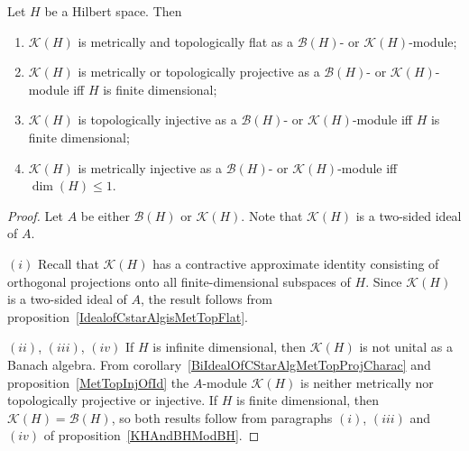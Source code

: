 \begin{proposition}\label{KHAndBHModKH} Let $H$ be a Hilbert space. Then 

\begin{enumerate}[label = (\roman*)]
    \item $\mathcal{K}(H)$ is metrically and topologically flat 
    as a $\mathcal{B}(H)$- or $\mathcal{K}(H)$-module;

    \item $\mathcal{K}(H)$ is metrically or topologically projective as
    a $\mathcal{B}(H)$- or $\mathcal{K}(H)$-module iff $H$ is finite dimensional;

    \item $\mathcal{K}(H)$ is topologically injective as a $\mathcal{B}(H)$- 
    or $\mathcal{K}(H)$-module iff $H$ is finite dimensional;

    \item $\mathcal{K}(H)$ is metrically injective as a $\mathcal{B}(H)$- 
    or $\mathcal{K}(H)$-module iff $\dim(H)\leq 1$.
\end{enumerate}
\end{proposition}
\begin{proof} Let $A$ be either $\mathcal{B}(H)$ or $\mathcal{K}(H)$. Note that
$\mathcal{K}(H)$ is a two-sided ideal of $A$. 

$(i)$ Recall that $\mathcal{K}(H)$ has a contractive approximate identity
consisting of orthogonal projections onto all finite-dimensional subspaces of
$H$. Since $\mathcal{K}(H)$ is a two-sided ideal of $A$, the result follows
from proposition~\ref{IdealofCstarAlgisMetTopFlat}.

$(ii)$, $(iii)$, $(iv)$ If $H$ is infinite dimensional, then $\mathcal{K}(H)$ is
not unital as a Banach algebra. From
corollary~\ref{BiIdealOfCStarAlgMetTopProjCharac} and
proposition~\ref{MetTopInjOfId} the $A$-module $\mathcal{K}(H)$ is neither
metrically nor topologically projective or injective. If $H$ is finite
dimensional, then $\mathcal{K}(H)=\mathcal{B}(H)$, so both results follow from
paragraphs $(i)$, $(iii)$ and $(iv)$ of proposition~\ref{KHAndBHModBH}.
\end{proof}

